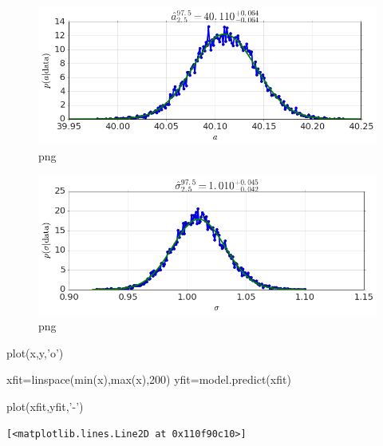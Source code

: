 \documentclass[]{article}
\newenvironment{Shaded}{}{}
\newcommand{\DataTypeTok}[1]{\textcolor[rgb]{0.56,0.13,0.00}{{#1}}}
\newcommand{\DecValTok}[1]{\textcolor[rgb]{0.25,0.63,0.44}{{#1}}}
\newcommand{\StringTok}[1]{\textcolor[rgb]{0.25,0.44,0.63}{{#1}}}
\newcommand{\NormalTok}[1]{{#1}}
\begin{document}
\begin{figure}[htbp]
\centering
\includegraphics{output_17_0.png}
\caption{png}
\end{figure}

\begin{figure}[htbp]
\centering
\includegraphics{output_17_1.png}
\caption{png}
\end{figure}

\begin{Shaded}
\begin{Highlighting}[]
\NormalTok{plot(x,y,}\StringTok{'o'}\NormalTok{)}

\NormalTok{xfit=linspace(}\DataTypeTok{min}\NormalTok{(x),}\DataTypeTok{max}\NormalTok{(x),}\DecValTok{200}\NormalTok{)}
\NormalTok{yfit=model.predict(xfit)}

\NormalTok{plot(xfit,yfit,}\StringTok{'-'}\NormalTok{)}
\end{Highlighting}
\end{Shaded}

\begin{verbatim}
[<matplotlib.lines.Line2D at 0x110f90c10>]
\end{verbatim}
\end{document}
